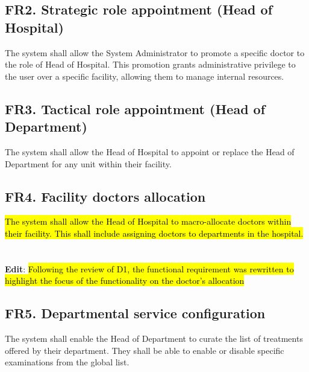 \documentclass[12pt, a4paper]{article}
\begin{document}
\subsection{FR2. Strategic role appointment (Head of Hospital)} \label{FR2}
The system shall allow the System Administrator to promote a specific doctor to the role of Head of Hospital. This promotion grants administrative privilege to the user over a specific facility, allowing them to manage internal resources.
\\ 


\subsection{FR3. Tactical role appointment (Head of Department)} \label{FR3}
The system shall allow the Head of Hospital to appoint or replace the Head of Department for any unit within their facility.
\\ 

\subsection{FR4. Facility doctors allocation} \label{FR4}
\hl{The system shall allow the Head of Hospital to macro-allocate doctors within their facility. This shall include assigning doctors to departments in the hospital.}
\\ 
\\
\\ \textbf{Edit}: \hl{Following the review of D1, the functional requirement was rewritten to highlight the focus of the functionality on the doctor's allocation}

\subsection{FR5. Departmental service configuration} \label{FR5}
The system shall enable the Head of Department to curate the list of treatments offered by their department. They shall be able to enable or disable specific examinations from the global list.
\\ 
\end{document}
